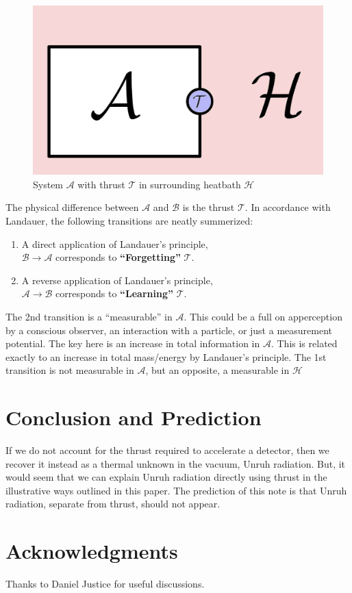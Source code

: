 \documentclass[12pt,a4paper]{article}
\begin{document}
\begin{figure}[h]
\centering
\includegraphics[scale=1.0]{pokeball.png}
\caption{System $\mathcal{A}$ with thrust $\mathcal{T}$ in surrounding heatbath $\mathcal{H}$}
\end{figure}

The physical difference between $\mathcal{A}$ and $\mathcal{B}$ is the thrust $\mathcal{T}$.  In accordance with Landauer, the following transitions are neatly summerized:
\begin{enumerate}
\item A direct application of Landauer's principle, \\ \hspace*{1 in} $\mathcal{B} \rightarrow \mathcal{A}$ corresponds to {\bf ``Forgetting''} $\mathcal{T}$.\\
\item A reverse application of Landauer's principle, \\ \hspace*{1 in} $\mathcal{A} \rightarrow \mathcal{B}$ corresponds to {\bf ``Learning''} $\mathcal{T}$.\\
\end{enumerate}
The 2nd transition is a ``measurable'' in $\mathcal{A}$. This could be a full on apperception by a conscious observer, an interaction with a particle, or just a measurement potential.  The key here is an increase in total information in $\mathcal{A}$.  This is related exactly to an increase in total mass/energy by Landauer's principle.  The 1st transition is not measurable in $\mathcal{A}$, but an opposite, a measurable in $\mathcal{H}$


\section{Conclusion and Prediction}
If we do not account for the thrust required to accelerate a detector, then we recover it instead as a thermal unknown in the vacuum, Unruh radiation.  But, it would seem that we can explain Unruh radiation directly using thrust in the illustrative ways outlined in this paper.  The prediction of this note is that Unruh radiation, separate from thrust, should not appear.

\section{Acknowledgments}
Thanks to Daniel Justice for useful discussions.



\end{document}
